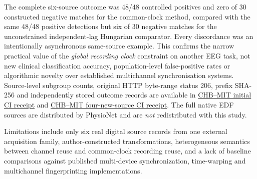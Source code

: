 The complete six-source outcome was 48/48 controlled positives and
zero of 30 constructed negative matches for the common-clock method,
compared with the same 48/48 positive detections but six of 30
negative matches for the unconstrained independent-lag Hungarian
comparator. Every discordance was an intentionally asynchronous
same-source example. This confirms the narrow practical value of
the \emph{global recording clock} constraint on another EEG task, not
new clinical classification accuracy, population-level false-positive
rates or algorithmic novelty over established multichannel
synchronisation systems. Source-level subgroup counts, original
HTTP byte-range status 206, prefix SHA-256 and independently
stored outcome records are available in
\href{https://github.com/lindicaphxag-tech/kaggle/actions/runs/38666039518}{CHB--MIT initial CI receipt}
and
\href{https://github.com/lindicaphxag-tech/kaggle/actions/runs/38666330505}{CHB--MIT four-new-source CI receipt}.
The full native EDF sources are distributed by PhysioNet and
are \emph{not} redistributed with this study.

Limitations include only six real digital source records from
one external acquisition family, author-constructed transformations,
heterogeneous semantics between channel reuse and common-clock
recording reuse, and a lack of baseline comparisons against
published multi-device synchronization, time-warping and
multichannel fingerprinting implementations.
